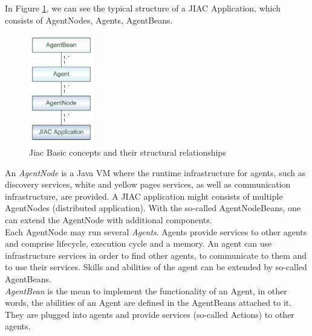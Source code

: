 In Figure \ref{fig:jiac_basic}, we can see the typical structure of a JIAC Application, which consists of AgentNodes, Agents, AgentBeans.
\begin{figure}[h]
	\centering
		\includegraphics[width=0.25\textwidth]{images/jiac_basic.png}
		\caption{Jiac Basic concepts and their structural relationships \cite{JIACMAN10}}
	\label{fig:jiac_basic}
\end{figure}
An \textit{AgentNode} is a Java VM where the runtime infrastructure for agents, such as discovery services, white and yellow pages services, as well as communication infrastructure, are provided. A JIAC application might consists of multiple AgentNodes (distributed application). With the so-called AgentNodeBeans, one can extend the AgentNode with additional components.\\

Each AgentNode may run several \textit{Agents}. Agents provide services to other agents
and comprise lifecycle, execution cycle and a memory. An agent can use infrastructure
services in order to find other agents, to communicate to them and to use their services.
Skills and abilities of the agent can be extended by so-called AgentBeans.\\
\textit{AgentBean} is the mean to implement the functionality of an Agent, in other words, the abilities of an Agent are defined in the AgentBeans attached to it. They are plugged into agents and provide services (so-called Actions) to other agents. 


